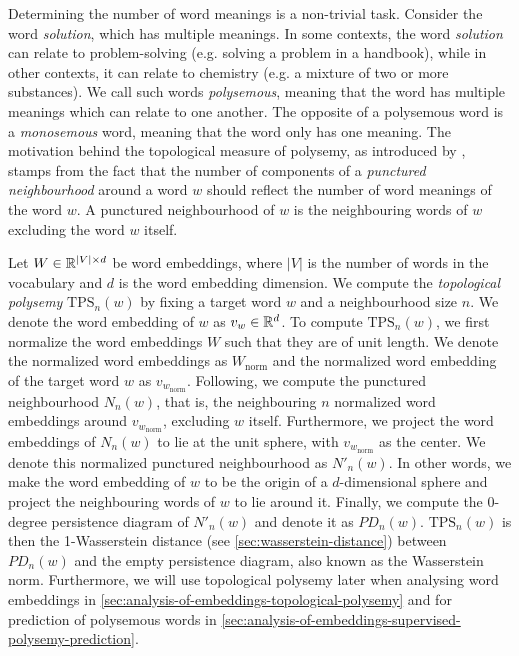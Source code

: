 Determining the number of word meanings is a non-trivial task. Consider the word \textit{solution}, which has multiple meanings. In some contexts, the word \textit{solution} can relate to problem-solving (e.g. solving a problem in a handbook), while in other contexts, it can relate to chemistry (e.g. a mixture of two or more substances). We call such words \textit{polysemous}, meaning that the word has multiple meanings which can relate to one another. The opposite of a polysemous word is a \textit{monosemous} word, meaning that the word only has one meaning. The motivation behind the topological measure of polysemy, as introduced by \cite{jakubowski2020topology}, stamps from the fact that the number of components of a \textit{punctured neighbourhood} around a word $w$ should reflect the number of word meanings of the word $w$. A punctured neighbourhood of $w$ is the neighbouring words of $w$ excluding the word $w$ itself.

Let $W \in \mathbb{R}^{|V| \times d}$ be word embeddings, where $|V|$ is the number of words in the vocabulary and $d$ is the word embedding dimension. We compute the \textit{topological polysemy} $\text{TPS}_n(w)$ by fixing a target word $w$ and a neighbourhood size $n$. We denote the word embedding of $w$ as $v_w \in \mathbb{R}^{d}$. To compute $\text{TPS}_n(w)$, we first normalize the word embeddings $W$ such that they are of unit length. We denote the normalized word embeddings as $W_\text{norm}$ and the normalized word embedding of the target word $w$ as $v_{w_{\text{norm}}}$. Following, we compute the punctured neighbourhood $N_n(w)$, that is, the neighbouring $n$ normalized word embeddings around $v_{w_{\text{norm}}}$, excluding $w$ itself. Furthermore, we project the word embeddings of $N_n(w)$ to lie at the unit sphere, with $v_{w_{\text{norm}}}$ as the center. We denote this normalized punctured neighbourhood as $N'_n(w)$. In other words, we make the word embedding of $w$ to be the origin of a $d$-dimensional sphere and project the neighbouring words of $w$ to lie around it. Finally, we compute the 0-degree persistence diagram of $N'_n(w)$ and denote it as $PD_n(w)$. $\text{TPS}_n(w)$ is then the 1-Wasserstein distance (see \cref{sec:wasserstein-distance}) between $PD_n(w)$ and the empty persistence diagram, also known as the Wasserstein norm. Furthermore, we will use topological polysemy later when analysing word embeddings in \cref{sec:analysis-of-embeddings-topological-polysemy} and for prediction of polysemous words in \cref{sec:analysis-of-embeddings-supervised-polysemy-prediction}.

